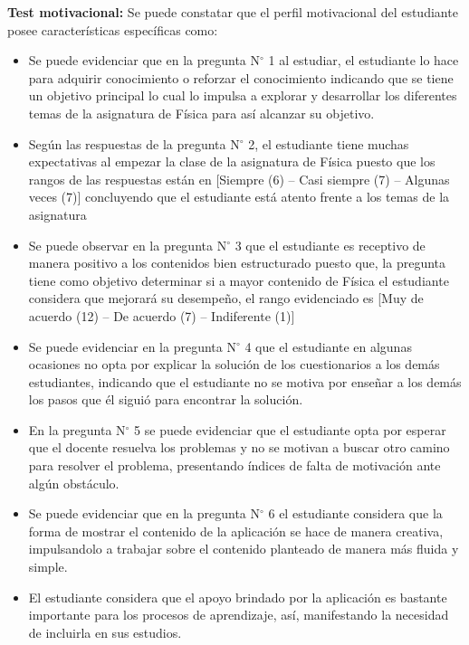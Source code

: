 \textbf{Test motivacional:} Se puede constatar que el perfil motivacional del estudiante posee características específicas como:
\begin{itemize}

\item Se puede evidenciar que en la pregunta N$^{\circ}$ 1 al estudiar, el estudiante lo hace para adquirir conocimiento o reforzar el conocimiento indicando que se tiene un objetivo principal lo cual lo impulsa a explorar y desarrollar los diferentes temas de la asignatura de Física para así alcanzar su objetivo.

\item Según las respuestas de la pregunta N$^{\circ}$ 2, el estudiante tiene muchas expectativas al empezar la clase de la asignatura de Física puesto que los rangos de las respuestas están en [Siempre (6) – Casi siempre (7) – Algunas veces (7)] concluyendo que el estudiante está atento frente a los temas de la asignatura

\item Se puede observar en la pregunta N$^{\circ}$ 3 que el estudiante es receptivo de manera positivo a los contenidos bien estructurado puesto que, la pregunta tiene como objetivo determinar si a mayor contenido de Física el estudiante considera que mejorará su desempeño, el rango evidenciado es [Muy de acuerdo (12) – De acuerdo (7) – Indiferente (1)]

\item Se puede evidenciar en la pregunta N$^{\circ}$ 4 que el estudiante en algunas ocasiones no opta por explicar la solución de los cuestionarios a los demás estudiantes, indicando que el estudiante no se motiva por enseñar a los demás los pasos que él siguió para encontrar la solución.

\item En la pregunta N$^{\circ}$ 5 se puede evidenciar que el estudiante opta por esperar que el docente resuelva los problemas y no se motivan a buscar otro camino para resolver el problema, presentando índices de falta de motivación ante algún obstáculo.

\item Se puede evidenciar que en la pregunta N$^{\circ}$ 6 el estudiante considera que la forma de mostrar el contenido de la aplicación se hace de manera creativa, impulsandolo a trabajar sobre el contenido planteado de manera más fluida y simple.

\item El estudiante considera que el apoyo brindado por la aplicación es bastante importante para los procesos de aprendizaje, así, manifestando la necesidad de incluirla en sus estudios.

\end{itemize}


